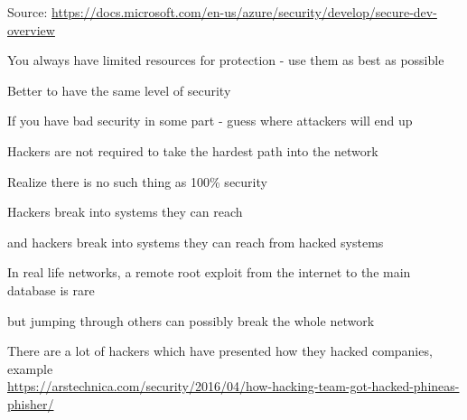 \documentclass[Screen16to9,17pt]{foils}
\begin{document}
Source:
\url{https://docs.microsoft.com/en-us/azure/security/develop/secure-dev-overview}




\begin{list1}
\item You always have limited resources for protection - use them as best as possible
\end{list1}




\begin{list1}
\item Better to have the same level of security
\item If you have bad security in some part - guess where attackers will end up
\item Hackers are not required to take the hardest path into the network
\item Realize there is no such thing as 100\% security
\end{list1}




\begin{list1}
\item Hackers break into systems they can reach
\item and hackers break into systems they can reach from hacked systems \smiley
\item In real life networks, a remote root exploit from the internet to the main database is rare
\item but jumping through others can possibly break the whole network
\item There are a lot of hackers which have presented how they hacked companies, example\\
{\tiny\url{https://arstechnica.com/security/2016/04/how-hacking-team-got-hacked-phineas-phisher/}}
\end{list1}

\end{document}
